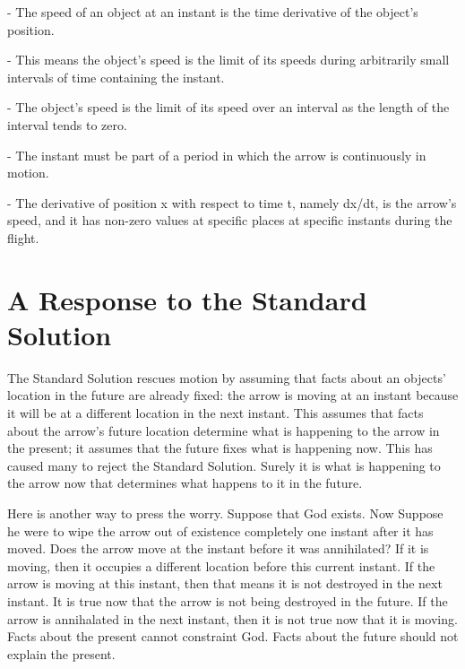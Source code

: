 \documentclass[oneside]{article}
\begin{document}
- The speed of an object at an instant is the time derivative of the object's position. 

- This means the object's speed is the limit of its speeds during arbitrarily small intervals of time containing the instant. 

- The object's speed is the limit of its speed over an interval as the length of the interval tends to zero.

- The instant must be part of a period in which the arrow is continuously in motion. 

- The derivative of position x with respect to time t, namely dx/dt, is the arrow's speed, and it has non-zero values at specific places at specific instants during the flight. 



\section{A Response to the Standard Solution}

The Standard Solution rescues motion by assuming that facts
  about an objects' location in the future are already fixed: the arrow is moving at an instant because it will be at a different location in the next instant. This assumes that facts about the arrow's future location determine what is happening to the arrow in the present; it assumes that the future fixes what is happening now. This has caused many to reject the Standard Solution. Surely it is what is happening to the arrow now that determines what happens to it in the future.  

Here is another way to press the worry. Suppose that God exists. Now Suppose he were to wipe the arrow out of existence completely one instant after it has moved. Does the arrow move at the instant before it was annihilated? If it is moving, then it occupies a different location before this current instant.  If the arrow is moving at this instant, then that means it is not  destroyed in the next instant. It is true now that the arrow is not  being destroyed in the future. If the arrow is annihalated in the next instant, then it is not true now that it is moving. Facts about the present cannot constraint God. Facts about the future should not explain the present. 
\end{document}
